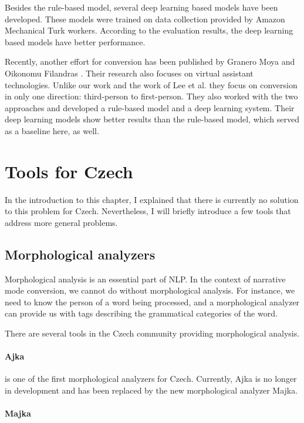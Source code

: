Besides the rule-based model, several deep learning based models have been developed. These models were trained on data collection provided by Amazon Mechanical Turk workers. According to the evaluation results, the deep learning based models have better performance.

Recently, another effort for conversion has been published by Granero Moya and Oikonomu Filandras \cite{granero-moya-oikonomou-filandras-2021-taking}. Their research also focuses on virtual assistant technologies. Unlike our work and the work of Lee et al. they focus on conversion in only one direction: third-person to first-person. They also worked with the two approaches and developed a rule-based model and a deep learning system. Their deep learning models show better results than the rule-based model, which served as a baseline here, as well.

\section{Tools for Czech}

In the introduction to this chapter, I explained that there is currently no solution to this problem for Czech. Nevertheless, I will briefly introduce a few tools that address more general problems.

\subsection{Morphological analyzers}

Morphological analysis is an essential part of NLP. In the context of narrative mode conversion, we cannot do without morphological analysis. For instance, we need to know the person of a word being processed, and a morphological analyzer can provide us with tags describing the grammatical categories of the word.

There are several tools in the Czech community providing morphological analysis.

\paragraph{Ajka}

is one of the first morphological analyzers for Czech. Currently, Ajka is no longer in development and has been replaced by the new morphological analyzer Majka. \cite{Sedlacekthesis}

\paragraph{Majka}


